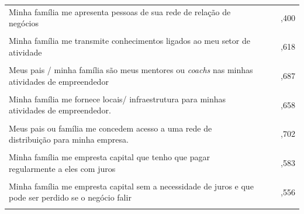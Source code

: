 \begin{longtable}[!h]{p{6cm} c c c }
Minha família me apresenta pessoas de sua rede de relação de negócios
 &  & & ,400 \\\\
 
Minha família me transmite conhecimentos ligados ao meu setor de atividade
 &  & & ,618 \\\\
 
Meus pais / minha família são meus mentores ou \textit{coachs} nas minhas atividades de empreendedor
 &  & & ,687 \\\\
 
Minha família me fornece locais/ infraestrutura para minhas atividades de empreendedor.
 &  & & ,658 \\\\
 
Meus pais ou família me concedem acesso a uma rede de distribuição para minha empresa.
 &  & & ,702 \\\\
 
 
Minha família me empresta capital que  tenho que pagar regularmente a eles com juros		
 &  & & ,583 \\\\
 
Minha família me empresta capital sem a necessidade de juros e que pode ser perdido se o negócio falir
 & & & ,556 \\\\ \hline 
 
\end{longtable}



